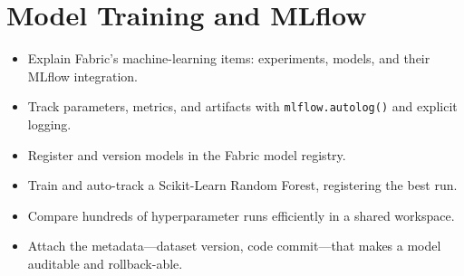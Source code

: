 \chapter{Model Training and MLflow}
%

\begin{objectives}
\begin{itemize}
    \item Explain Fabric's machine-learning items: experiments, models, and their MLflow integration.
    \item Track parameters, metrics, and artifacts with \texttt{mlflow.autolog()} and explicit logging.
    \item Register and version models in the Fabric model registry.
    \item Train and auto-track a Scikit-Learn Random Forest, registering the best run.
    \item Compare hundreds of hyperparameter runs efficiently in a shared workspace.
    \item Attach the metadata---dataset version, code commit---that makes a model auditable and rollback-able.
\end{itemize}
\end{objectives}

